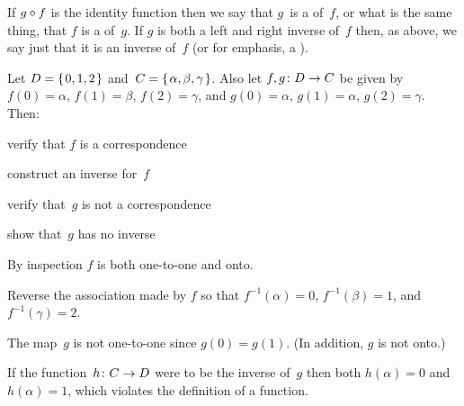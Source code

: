 \documentclass{ibl}  %
\begin{document}
If $g\mathbin{\circ} f$ is the identity function then we say that 
$g$~is a  of~$f$\!, or what is the
same thing, that $f$ is a  of~$g$.
If $g$ is both a left and right inverse of~$f$ then, 
as above, we say just that it is
an inverse of~$f$ (or for emphasis, a ). 

\begin{problem}
Let $D=\mbox{$\{\hspace{0.1em}0,1,2\hspace{0.1em}\}$}$ and~$C=\mbox{$\{\hspace{0.1em}\alpha,\beta,\gamma\hspace{0.1em}\}$}$.
Also let $\mbox{$f,g\colon D\to C$}$ be given by
$f(0)=\alpha$, $f(1)=\beta$, $f(2)=\gamma$, and
$g(0)=\alpha$, $g(1)=\alpha$, $g(2)=\gamma$.
Then:
\begin{items}
\item verify that $f$ is a correspondence
\item construct an inverse for~$f$\!
\item verify that~$g$ is not a correspondence
\item show that~$g$ has no inverse 
\end{items}
\begin{answer}
\begin{items}
\item By inspection $f$ is both one-to-one and onto.
\item Reverse the association made by $f$ so that $f^{-1}(\alpha)=0$,
  $f^{-1}(\beta)=1$, and~$f^{-1}(\gamma)=2$.
\item The map~$g$ is not one-to-one since $g(0)=g(1)$.
  (In addition, $g$ is not onto.) 
\item If the function~$\mbox{$h\colon C\to D$}$ were to be the inverse of~$g$
  then both $h(\alpha)=0$ and~$h(\alpha)=1$, 
  which violates the definition of a function.   
\end{items}
\end{answer}
\end{problem}
\end{document}
